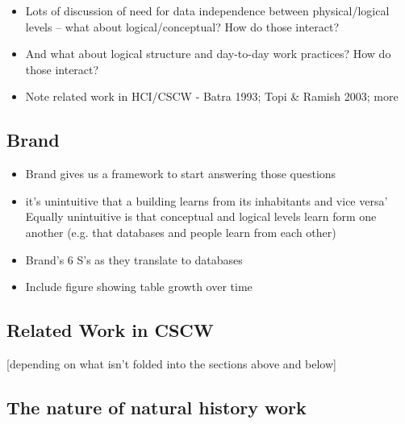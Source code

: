 \begin{itemize}
\item Lots of discussion of need for data independence between physical/logical levels – what about logical/conceptual? How do those interact?
\item And what about logical structure and day-to-day work practices? How do those interact?
\item Note related work in HCI/CSCW - Batra 1993; Topi & Ramish 2003; more
\end{itemize}

\subsection{Brand}

\begin{itemize}
\item Brand gives us a framework to start answering those questions
\item	it's unintuitive that a building learns from its inhabitants and vice versa’ Equally unintuitive is that conceptual and logical levels learn form one another (e.g. that databases and people learn from each other)
\item Brand’s 6 S’s as they translate to databases
\item Include figure showing table growth over time
\end{itemize}

\subsection{Related Work in CSCW}

[depending on what isn't folded into the sections above and below]

\subsection{The nature of natural history work}

